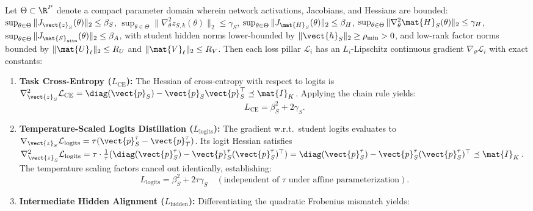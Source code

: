 \begin{lemma}
\label{lem:component_lipschitz_bounds}
Let $\Theta \subset \R^P$ denote a compact parameter domain wherein network activations, Jacobians, and Hessians are bounded:
$\sup_{\theta \in \Theta} \|J_{\vect{z}_S}(\theta)\|_2 \le \beta_S$, $\sup_{\theta \in \Theta} \|\nabla_\theta^2 z_{S, k}(\theta)\|_2 \le \gamma_S$, $\sup_{\theta \in \Theta} \|J_{\mat{H}_S}(\theta)\|_2 \le \beta_H$, $\sup_{\theta \in \Theta} \|\nabla_\theta^2 \mat{H}_S(\theta)\|_2 \le \gamma_H$, $\sup_{\theta \in \Theta} \|J_{\mat{S}_{\text{attn}}}(\theta)\|_2 \le \beta_A$, with student hidden norms lower-bounded by $\|\vect{h}_S\|_2 \ge \rho_{\min} > 0$, and low-rank factor norms bounded by $\|\mat{U}_\ell\|_2 \le R_U$ and $\|\mat{V}_\ell\|_2 \le R_V$. Then each loss pillar $\mathcal{L}_i$ has an $L_i$-Lipschitz continuous gradient $\nabla_\theta \mathcal{L}_i$ with exact constants:
\begin{enumerate}
    \item \textbf{Task Cross-Entropy ($L_{\text{CE}}$):} The Hessian of cross-entropy with respect to logits is $\nabla_{\vect{z}_S}^2 \mathcal{L}_{\text{CE}} = \diag(\vect{p}_S) - \vect{p}_S \vect{p}_S^\top \preceq \mat{I}_K$. Applying the chain rule yields:
    \begin{equation}
    L_{\text{CE}} = \beta_S^2 + 2 \gamma_S.
    \label{eq:lipschitz_ce}
    \end{equation}
    \item \textbf{Temperature-Scaled Logits Distillation ($L_{\text{logits}}$):} The gradient w.r.t.\ student logits evaluates to $\nabla_{\vect{z}_S} \mathcal{L}_{\text{logits}} = \tau (\vect{p}_S^\tau - \vect{p}_T^\tau)$. Its logit Hessian satisfies $\nabla_{\vect{z}_S}^2 \mathcal{L}_{\text{logits}} = \tau \cdot \frac{1}{\tau} (\diag(\vect{p}_S^\tau) - \vect{p}_S^\tau (\vect{p}_S^\tau)^\top) = \diag(\vect{p}_S^\tau) - \vect{p}_S^\tau (\vect{p}_S^\tau)^\top \preceq \mat{I}_K$. The temperature scaling factors cancel out identically, establishing:
    \begin{equation}
    L_{\text{logits}} = \beta_S^2 + 2 \tau \gamma_S \quad (\text{independent of } \tau \text{ under affine parameterization}).
    \label{eq:lipschitz_logits}
    \end{equation}
    \item \textbf{Intermediate Hidden Alignment ($L_{\text{hidden}}$):} Differentiating the quadratic Frobenius mismatch yields:
    \begin{equation}

\end{equation}
\end{enumerate}
\end{lemma}
